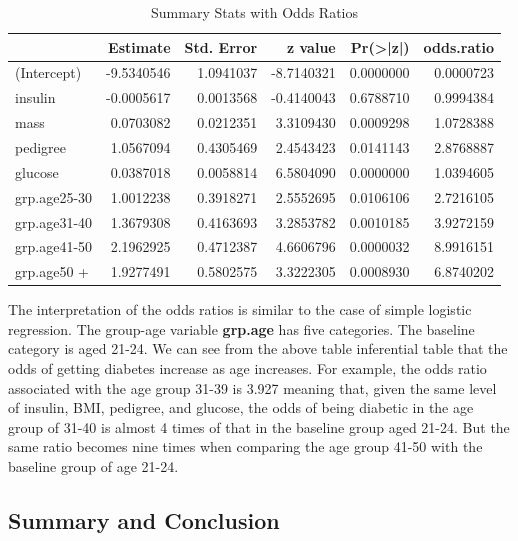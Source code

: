 \documentclass[
]{book}
\begin{document}
\begin{table}

\caption{\label{tab:unnamed-chunk-138}Summary Stats with Odds Ratios}
\centering
\begin{tabular}[t]{l|r|r|r|r|r}
\hline
  & Estimate & Std. Error & z value & Pr(>|z|) & odds.ratio\\
\hline
(Intercept) & -9.5340546 & 1.0941037 & -8.7140321 & 0.0000000 & 0.0000723\\
\hline
insulin & -0.0005617 & 0.0013568 & -0.4140043 & 0.6788710 & 0.9994384\\
\hline
mass & 0.0703082 & 0.0212351 & 3.3109430 & 0.0009298 & 1.0728388\\
\hline
pedigree & 1.0567094 & 0.4305469 & 2.4543423 & 0.0141143 & 2.8768887\\
\hline
glucose & 0.0387018 & 0.0058814 & 6.5804090 & 0.0000000 & 1.0394605\\
\hline
grp.age25-30 & 1.0012238 & 0.3918271 & 2.5552695 & 0.0106106 & 2.7216105\\
\hline
grp.age31-40 & 1.3679308 & 0.4163693 & 3.2853782 & 0.0010185 & 3.9272159\\
\hline
grp.age41-50 & 2.1962925 & 0.4712387 & 4.6606796 & 0.0000032 & 8.9916151\\
\hline
grp.age50 + & 1.9277491 & 0.5802575 & 3.3222305 & 0.0008930 & 6.8740202\\
\hline
\end{tabular}
\end{table}

The interpretation of the odds ratios is similar to the case of simple logistic regression. The group-age variable \textbf{grp.age} has five categories. The baseline category is aged 21-24. We can see from the above table inferential table that the odds of getting diabetes increase as age increases. For example, the odds ratio associated with the age group 31-39 is 3.927 meaning that, given the same level of insulin, BMI, pedigree, and glucose, the odds of being diabetic in the age group of 31-40 is almost 4 times of that in the baseline group aged 21-24. But the same ratio becomes nine times when comparing the age group 41-50 with the baseline group of age 21-24.

\hypertarget{summary-and-conclusion}{%
\subsection{Summary and Conclusion}\label{summary-and-conclusion}}
\end{document}
